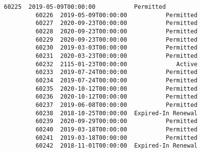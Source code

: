 \documentclass[11pt]{article}
\begin{document}
\begin{Verbatim}[commandchars=\\\{\}]
         60225  2019-05-09T00:00:00           Permitted   
         60226  2019-05-09T00:00:00           Permitted   
         60227  2020-09-23T00:00:00           Permitted   
         60228  2020-09-23T00:00:00           Permitted   
         60229  2020-09-23T00:00:00           Permitted   
         60230  2019-03-03T00:00:00           Permitted   
         60231  2020-03-23T00:00:00           Permitted   
         60232  2115-01-23T00:00:00              Active   
         60233  2019-07-24T00:00:00           Permitted   
         60234  2019-07-24T00:00:00           Permitted   
         60235  2020-10-12T00:00:00           Permitted   
         60236  2020-10-12T00:00:00           Permitted   
         60237  2019-06-08T00:00:00           Permitted   
         60238  2018-10-25T00:00:00  Expired-In Renewal   
         60239  2020-09-29T00:00:00           Permitted   
         60240  2019-03-18T00:00:00           Permitted   
         60241  2019-03-18T00:00:00           Permitted   
         60242  2018-11-01T00:00:00  Expired-In Renewal   
         

\end{Verbatim}
\end{document}
